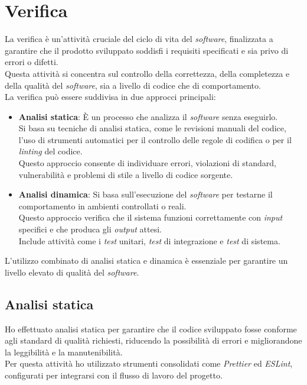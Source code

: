 \pagebreak
\section{Verifica}
\label{sez:verifica}

La verifica è un'attività cruciale del ciclo di vita del \textit{software}, finalizzata a garantire che il prodotto sviluppato soddisfi i requisiti specificati e sia privo di errori o difetti.\\
Questa attività si concentra sul controllo della correttezza, della completezza e della qualità del \textit{software}, sia a livello di codice che di comportamento.\\

\noindent La verifica può essere suddivisa in due approcci principali:

\begin{itemize}
\item \textbf{Analisi statica}:
È un processo che analizza il \textit{software} senza eseguirlo. \\
Si basa su tecniche di analisi statica, come le revisioni manuali del codice, l'uso di strumenti automatici per il controllo delle regole di codifica o per il \textit{linting} del codice. \\
Questo approccio consente di individuare errori, violazioni di standard, vulnerabilità e problemi di stile a livello di codice sorgente.  

\item \textbf{Analisi dinamica}:
Si basa sull’esecuzione del \textit{software} per testarne il comportamento in ambienti controllati o reali.\\
Questo approccio verifica che il sistema funzioni correttamente con \textit{input} specifici e che produca gli \textit{output} attesi. \\
Include attività come i \textit{test} unitari, \textit{test} di integrazione e \textit{test} di sistema.  
\end{itemize}

\noindent L’utilizzo combinato di analisi statica e dinamica è essenziale per garantire un livello elevato di qualità del \textit{software}. \\

\subsection{Analisi statica}
\label{subsec:analisi-statica}

Ho effettuato analisi statica per garantire che il codice sviluppato fosse conforme agli standard di qualità richiesti, riducendo la possibilità di errori e migliorandone la leggibilità e la manutenibilità.\\
Per questa attività ho utilizzato strumenti consolidati come \textit{Prettier} ed \textit{ESLint}, configurati per integrarsi con il flusso di lavoro del progetto.\\

